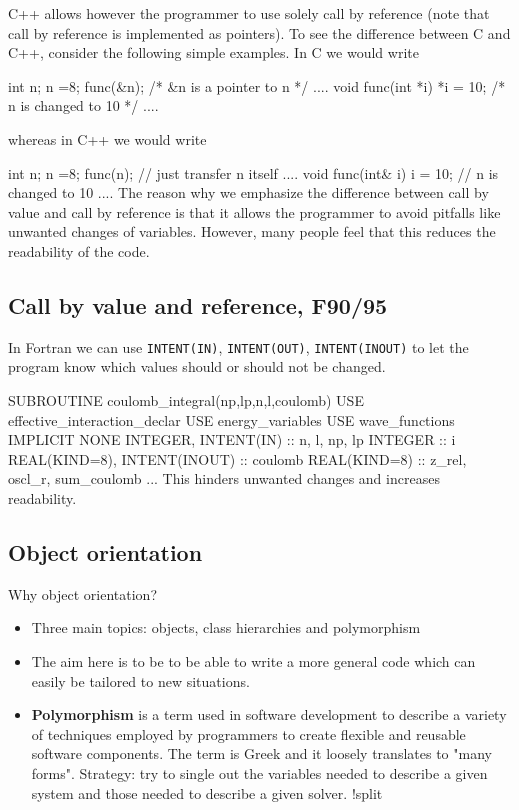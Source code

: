 \documentclass[%
oneside,                 %
final,                   %
10pt]{article}
\begin{document}
{{{{{C++ allows however the programmer to use solely call by reference
(note that call by reference is implemented as pointers).
To see the difference between C and C++, consider the following simple
examples. In C we would write

\bcppcod
   int n; n =8;
   func(&n); /* &n is a pointer to n */
   ....
   void func(int *i)
   {
     *i = 10; /* n is changed to 10 */
     ....
   }
\ecppcod

whereas in C++ we would write

\bcppcod
   int n; n =8;
   func(n); // just transfer n itself
   ....
   void func(int& i)
   {
     i = 10; // n is changed to 10
     ....
   }
\ecppcod
The reason why we emphasize the difference between call by value and call
by reference is that it allows the programmer to avoid pitfalls
like unwanted changes of variables. However, many people feel that this
reduces the readability of the code.


\subsection{Call by value and reference, F90/95}

In Fortran we can use \Verb!INTENT(IN)!, \Verb!INTENT(OUT)!, \Verb!INTENT(INOUT)! to let the
program know which values should or should not be changed.

\bfcod
SUBROUTINE coulomb_integral(np,lp,n,l,coulomb)
  USE effective_interaction_declar
  USE energy_variables
  USE wave_functions
  IMPLICIT NONE
  INTEGER, INTENT(IN)  :: n, l, np, lp
  INTEGER :: i
  REAL(KIND=8), INTENT(INOUT) :: coulomb
  REAL(KIND=8) :: z_rel, oscl_r, sum_coulomb
  ...
\efcod
This hinders unwanted changes and increases readability.



\subsection{Object orientation}

Why object orientation?

\begin{itemize}
  \item Three main topics: objects, class hierarchies and polymorphism

  \item The aim here is to be to be able to write a more general code which can easily be tailored to new situations.

  \item {\bf Polymorphism} is a term used in software development to describe a variety of techniques employed by programmers to create flexible and reusable software components. The term is Greek and it loosely translates to "many forms". Strategy: try to single out the variables needed to describe a given system and those needed to describe a given solver. !split
\end{itemize}

}}}}}
\end{document}
